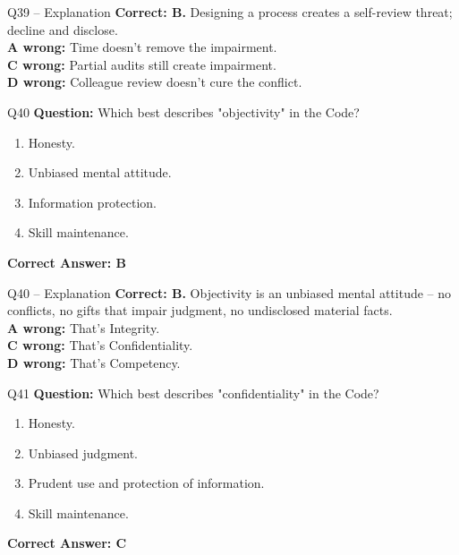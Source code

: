 \documentclass[aspectratio=169,10pt]{beamer}
\begin{document}
	\begin{frame}[t]{Q39 -- Explanation}
		\small
		\textbf{Correct: B.} Designing a process creates a self-review threat; decline and disclose. \\[4pt]
		\textbf{A wrong:} Time doesn't remove the impairment. \\[2pt]
		\textbf{C wrong:} Partial audits still create impairment. \\[2pt]
		\textbf{D wrong:} Colleague review doesn't cure the conflict.
	\end{frame}
	
	\begin{frame}[t]{Q40}
		\small
		\textbf{Question:} Which best describes "objectivity" in the Code?
		\begin{enumerate}[label=\Alph*.,itemsep=1pt,topsep=2pt]
			\item Honesty.
			\item Unbiased mental attitude.
			\item Information protection.
			\item Skill maintenance.
		\end{enumerate}
		\vspace{4pt}
		\textbf{Correct Answer: B}
	\end{frame}
	
	\begin{frame}[t]{Q40 -- Explanation}
		\small
		\textbf{Correct: B.} Objectivity is an unbiased mental attitude -- no conflicts, no gifts that impair judgment, no undisclosed material facts. \\[4pt]
		\textbf{A wrong:} That's Integrity. \\[2pt]
		\textbf{C wrong:} That's Confidentiality. \\[2pt]
		\textbf{D wrong:} That's Competency.
	\end{frame}
	
	\begin{frame}[t]{Q41}
		\small
		\textbf{Question:} Which best describes "confidentiality" in the Code?
		\begin{enumerate}[label=\Alph*.,itemsep=1pt,topsep=2pt]
			\item Honesty.
			\item Unbiased judgment.
			\item Prudent use and protection of information.
			\item Skill maintenance.
		\end{enumerate}
		\vspace{4pt}
		\textbf{Correct Answer: C}
	\end{frame}
	
\end{document}
